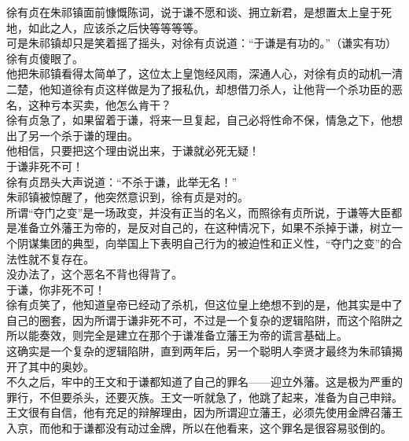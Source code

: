 \begin{multicols}{\theparacolNo}
徐有贞在朱祁镇面前慷慨陈词，说于谦不愿和谈、拥立新君，是想置太上皇于死地，如此之人，应该杀之后快等等等等。\\

可是朱祁镇却只是笑着摇了摇头，对徐有贞说道：“于谦是有功的。”（谦实有功）\\

徐有贞傻眼了。\\

他把朱祁镇看得太简单了，这位太上皇饱经风雨，深通人心，对徐有贞的动机一清二楚，他知道徐有贞这样做是为了报私仇，却想借刀杀人，让他背一个杀功臣的恶名，这种亏本买卖，他怎么肯干？\\

徐有贞急了，如果留着于谦，将来一旦复起，自己必将性命不保，情急之下，他想出了另一个杀于谦的理由。\\

他相信，只要把这个理由说出来，于谦就必死无疑！\\

于谦非死不可！\\

徐有贞昂头大声说道：“不杀于谦，此举无名！”\\

朱祁镇被惊醒了，他突然意识到，徐有贞是对的。\\

所谓“夺门之变”是一场政变，并没有正当的名义，而照徐有贞所说，于谦等大臣都是准备立外藩王为帝的，是反对自己的，在这种情况下，如果不杀掉于谦，树立一个阴谋集团的典型，向举国上下表明自己行为的被迫性和正义性，“夺门之变”的合法性就不复存在。\\

没办法了，这个恶名不背也得背了。\\

于谦，你非死不可！\\

徐有贞笑了，他知道皇帝已经动了杀机，但这位皇上绝想不到的是，他其实是中了自己的圈套，因为所谓于谦非死不可，不过是一个复杂的逻辑陷阱，而这个陷阱之所以能奏效，则完全是建立在那个于谦准备立藩王为帝的谎言基础上。\\

这确实是一个复杂的逻辑陷阱，直到两年后，另一个聪明人李贤才最终为朱祁镇揭开了其中的奥妙。\\

不久之后，牢中的王文和于谦都知道了自己的罪名——迎立外藩。这是极为严重的罪行，不但要杀头，还要灭族。王文一听就急了，他跳了起来，准备为自己申辩。\\

王文很有自信，他有充足的辩解理由，因为所谓迎立藩王，必须先使用金牌召藩王入京，而他和于谦都没有动过金牌，所以在他看来，这个罪名是很容易驳倒的。\\


\end{multicols}
